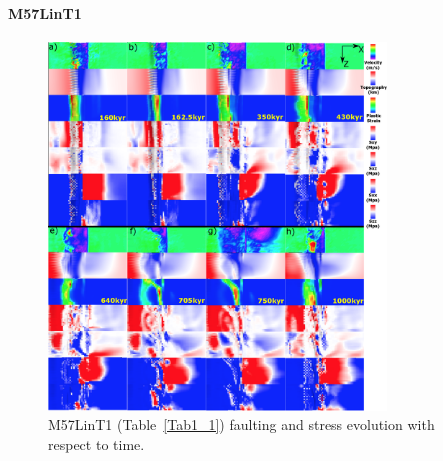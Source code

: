 \paragraph{M57LinT1}\label{para_M57LinT1}

\begin{figure}[h]
 \centering
  \includegraphics[width=0.8\textwidth]{./Figures/fig_Results_MRange_2_M57LinT1_time_evolution.eps}
 \caption{M57LinT1 (Table~\hyperref[Tab1_1]{\ref{Tab1_1}}) faulting and stress evolution with respect to time.}
\label{fig_Results_MRange_2}
\end{figure}

